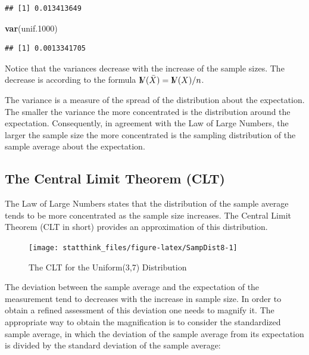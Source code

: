 \documentclass[]{krantz}
\makeatletter
\newenvironment{Shaded}{\begin{snugshade}}{\end{snugshade}}
\newcommand{\KeywordTok}[1]{\textcolor[rgb]{0.13,0.29,0.53}{\textbf{#1}}}
\newcommand{\DecValTok}[1]{\textcolor[rgb]{0.00,0.00,0.81}{#1}}
\newcommand{\NormalTok}[1]{#1}
\newcommand{\Var}{{\rm I\kern-.3em V}}
\newenvironment{kframe}{%
\medskip{}
\setlength{\fboxsep}{.8em}
 \def\at@end@of@kframe{}%
 \ifinner\ifhmode%
  \def\at@end@of@kframe{\end{minipage}}%
  \begin{minipage}{\columnwidth}%
 \fi\fi%
 \def\FrameCommand##1{\hskip\@totalleftmargin \hskip-\fboxsep
 \colorbox{shadecolor}{##1}\hskip-\fboxsep
     \hskip-\linewidth \hskip-\@totalleftmargin \hskip\columnwidth}%
 \MakeFramed {\advance\hsize-\width
   \@totalleftmargin\z@ \linewidth\hsize
   \@setminipage}}%
 {\par\unskip\endMakeFramed%
 \at@end@of@kframe}
\renewenvironment{Shaded}{\begin{kframe}}{\end{kframe}}
\theoremstyle{definition}
\theoremstyle{definition}
\theoremstyle{definition}
\theoremstyle{remark}
\makeatother
\begin{document}
\begin{verbatim}
## [1] 0.013413649
\end{verbatim}

\begin{Shaded}
\begin{Highlighting}[]
\KeywordTok{var}\NormalTok{(unif.}\DecValTok{1000}\NormalTok{)}
\end{Highlighting}
\end{Shaded}

\begin{verbatim}
## [1] 0.0013341705
\end{verbatim}

Notice that the variances decrease with the increase of the sample
sizes. The decrease is according to the formula
\(\Var(\bar X) = \Var(X)/n\).

The variance is a measure of the spread of the distribution about the
expectation. The smaller the variance the more concentrated is the
distribution around the expectation. Consequently, in agreement with the
Law of Large Numbers, the larger the sample size the more concentrated
is the sampling distribution of the sample average about the
expectation.

\subsection{The Central Limit Theorem
(CLT)}\label{the-central-limit-theorem-clt}

The Law of Large Numbers states that the distribution of the sample
average tends to be more concentrated as the sample size increases. The
Central Limit Theorem (CLT in short) provides an approximation of this
distribution.

\begin{figure}

{\centering \texttt{[image: statthink\_files/figure-latex/SampDist8-1]} 

}

\caption{The CLT for the Uniform(3,7) Distribution}\label{fig:SampDist8}
\end{figure}

The deviation between the sample average and the expectation of the
measurement tend to decreases with the increase in sample size. In order
to obtain a refined assessment of this deviation one needs to magnify
it. The appropriate way to obtain the magnification is to consider the
standardized sample average, in which the deviation of the sample
average from its expectation is divided by the standard deviation of the
sample average:
\end{document}
